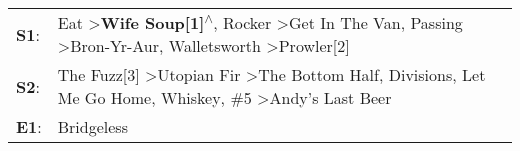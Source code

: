 \begin{supertabular}{p{0.03\textwidth}p{0.92\textwidth}}
 \textbf{S1}:  &  Eat\textsuperscript{} \textgreater \enspace \textbf{Wife Soup[1]\textsuperscript{$\wedge$}}, \enspace Rocker\textsuperscript{} \textgreater \enspace Get In The Van\textsuperscript{}, \enspace Passing\textsuperscript{} \textgreater \enspace Bron-Yr-Aur\textsuperscript{}, \enspace Walletsworth\textsuperscript{} \textgreater \enspace Prowler[2]\textsuperscript{}  \enspace  \\
 \textbf{S2}:  &                                               The Fuzz[3]\textsuperscript{} \textgreater \enspace Utopian Fir\textsuperscript{} \textgreater \enspace The Bottom Half\textsuperscript{}, \enspace Divisions\textsuperscript{}, \enspace Let Me Go Home, Whiskey\textsuperscript{}, \enspace \#5\textsuperscript{} \textgreater \enspace Andy's Last Beer\textsuperscript{}  \enspace  \\
 \textbf{E1}:  &                                                                                                                                                                                                                                                                                                                                               Bridgeless\textsuperscript{}  \enspace  \\
\end{supertabular}
